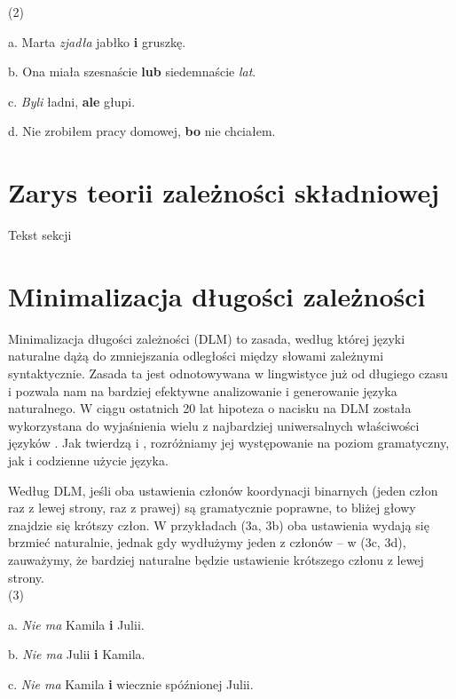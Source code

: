 \documentclass[licencjacka]{pracamgr_Kogni}
\begin{document}
(2)

a. Marta \textit{zjadła} jabłko \textbf{i} gruszkę.

b. Ona miała szesnaście \textbf{lub} siedemnaście \textit{lat}.

c. \textit{Byli} ładni, \textbf{ale} głupi.

d. Nie zrobiłem pracy domowej, \textbf{bo} nie chciałem.

\section{Zarys teorii zależności składniowej}
Tekst sekcji

\section{Minimalizacja długości zależności}
Minimalizacja długości zależności (DLM) to zasada, według której języki naturalne dążą do zmniejszania odległości między słowami zależnymi syntaktycznie. Zasada ta jest odnotowywana w lingwistyce już od długiego czasu i pozwala nam na bardziej efektywne analizowanie i generowanie języka naturalnego. W ciągu ostatnich 20 lat hipoteza o nacisku na DLM została wykorzystana do wyjaśnienia wielu z najbardziej uniwersalnych właściwości języków \citep{FutrellEtAl2015}.
Jak twierdzą \citet{Hawkins1994} i \citet{FutrellEtAl2020}, rozróżniamy jej występowanie na poziom gramatyczny, jak i codzienne użycie języka.

Według DLM, jeśli oba ustawienia członów koordynacji binarnych (jeden człon raz z lewej strony, raz z prawej) są gramatycznie poprawne, to bliżej głowy znajdzie się krótszy człon. W przykładach (3a, 3b) oba ustawienia wydają się brzmieć naturalnie, jednak gdy wydłużymy jeden z członów -- w (3c, 3d), zauważymy, że bardziej naturalne będzie ustawienie krótszego członu z lewej strony.
\\

(3)

a. \textit{Nie ma} Kamila \textbf{i} Julii.

b. \textit{Nie ma} Julii \textbf{i} Kamila.

c. \textit{Nie ma} Kamila \textbf{i} wiecznie spóźnionej Julii.
\end{document}
